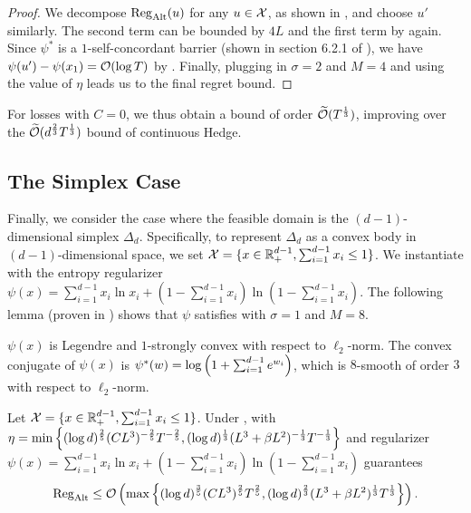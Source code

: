 \begin{proof}
    We decompose $\mathrm{Reg}_{\mathrm{Alt}}(u)$ for any $u\in{\mathcal{X}}$, as shown in , and choose $u'$ similarly. The second term can be bounded by $4L$ and the first term by  again. Since $\psi^*$ is a $1$-self-concordant barrier (shown in section 6.2.1 of \citep{nesterov1994interior}), we have $\psi(u')-\psi(x_1)=\mathcal{O}(\log T)$ by . 
    Finally, plugging in $\sigma=2$ and $M=4$ and using the value of $\eta$ leads us to the final regret bound.
\end{proof}

For losses with $C=0$, we thus obtain a bound of order $\widetilde{\mathcal{O}}(T^\frac{1}{3})$, improving over the $\widetilde{\mathcal{O}}(d^{\frac{2}{3}}T^\frac{1}{3})$ bound of continuous Hedge.


\subsection{The Simplex Case}\label{sec:simplex}
Finally, we consider the case where the feasible domain is the $(d-1)$-dimensional simplex $\Delta_d$. Specifically, to represent $\Delta_d$ as a convex body in $(d-1)$-dimensional space, we set ${\mathcal{X}}=\{x\in \mathbb{R}_+^{d-1}, \sum_{i=1}^{d-1}x_i\leq 1\}$. We instantiate  with the entropy regularizer $\psi(x) = \sum_{i=1}^{d-1} x_i \ln x_i + (1-\sum_{i=1}^{d-1}x_i)\ln (1-\sum_{i=1}^{d-1}x_i)$. The following lemma (proven in ) shows that $\psi$ satisfies  with $\sigma = 1$ and $M=8$.

\begin{lemma}\label{lem:negative entropy}
    $\psi(x)$ is Legendre and $1$-strongly convex with respect to $\ell_2$-norm. The convex conjugate of $\psi(x)$ is $\psi^*(w)=\log\left(1+\sum_{i=1}^{d-1} e^{w_i}\right)$, which is $8$-smooth of order $3$ with respect to $\ell_2$-norm.
\end{lemma}

\begin{corollary}\label{cor: simplex}
Let ${\mathcal{X}}=\{x\in \mathbb{R}_+^{d-1}, \sum_{i=1}^{d-1}x_i\leq 1\}$. Under ,  with $\eta =\min\left\{(\log d)^{\frac{2}{5}}(CL^3)^{-\frac{2}{5}}T^{-\frac{2}{5}},(\log d)^{\frac{1}{3}}(L^3+\beta L^2)^{-\frac{1}{3}}T^{-\frac{1}{3}}\right\}$ and regularizer $\psi(x)= \sum_{i=1}^{d-1} x_i \ln x_i + (1-\sum_{i=1}^{d-1}x_i)\ln (1-\sum_{i=1}^{d-1}x_i)$ guarantees 
\[
\mathrm{Reg}_{\mathrm{Alt}} \le \mathcal{O}\left(\max\left\{(\log d)^{\frac{3}{5}}(CL^3)^{\frac{2}{5}}T^{\frac{2}{5}},(\log d)^{\frac{2}{3}}(L^3+\beta L^2)^{\frac{1}{3}}T^{\frac{1}{3}}\right\}\right).
\]
\end{corollary}

